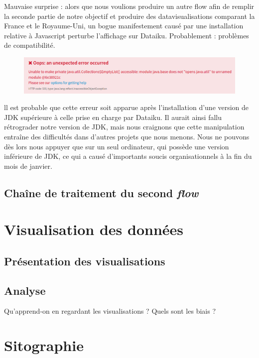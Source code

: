 \documentclass[hidelinks, 12pt]{article}
\begin{document}
Mauvaise surprise : alors que nous voulions produire un autre flow afin de remplir la seconde partie de notre objectif et produire des datavisualisations comparant la France et le Royaume-Uni, un bogue manifestement causé par une installation relative à Javascript perturbe l'affichage sur Dataiku. Probablement : problèmes de compatibilité.

\begin{center}
	\begin{figure}[H]
		\includegraphics[scale=0.5]{bogue.png}
	\end{figure}
\end{center}

ll est probable que cette erreur soit apparue après l’installation d’une version de JDK supérieure à celle prise en charge par Dataiku. Il aurait ainsi fallu rétrograder notre version de JDK, mais nous craignons que cette manipulation entraîne des difficultés dans d’autres projets que nous menons. Nous ne pouvons dès lors nous appuyer que sur un seul ordinateur, qui possède une version inférieure de JDK, ce qui a causé d’importants soucis organisationnels à la fin du mois de janvier.

\subsection{Chaîne de traitement du second \emph{flow}}


\section{Visualisation des données}

\subsection{Présentation des visualisations}

\subsection{Analyse}

Qu'apprend-on en regardant les visualisations ? Quels sont les biais ?
\newpage


\section{Sitographie}
\printbibliography[heading=none]
\newpage

\tableofcontents
\end{document}
